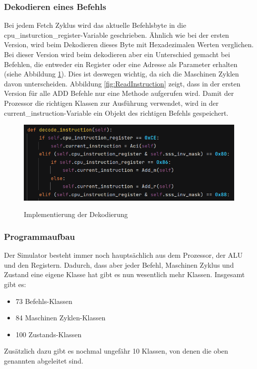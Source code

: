 \documentclass[12pt]{article}
\newcommand{\imgSpaceBefore}{\\[0.2cm]}
\begin{document}
\subsubsection{Dekodieren eines Befehls}
Bei jedem Fetch Zyklus wird das aktuelle Befehlsbyte in die cpu\_insturction\_register-Variable geschrieben. Ähnlich wie bei der ersten Version, wird beim Dekodieren dieses Byte mit Hexadezimalen Werten verglichen. Bei dieser Version wird beim dekodieren aber ein Unterschied gemacht bei Befehlen, die entweder ein Register oder eine Adresse als Parameter erhalten (siehe Abbildung \ref{fig:Decode_instr}). Dies ist deswegen wichtig, da sich die Maschinen Zyklen davon unterscheiden. Abbildung \ref{fig:ReadInstruction}  zeigt, dass in der ersten Version für alle ADD Befehle nur eine Methode aufgerufen wird. Damit der Prozessor die richtigen Klassen zur Ausführung verwendet, wird in der current\_instruction-Variable ein Objekt des richtigen Befehls gespeichert.
\imgSpaceBefore
\begin{figure}[H]
\caption{Implementierung der Dekodierung}
\centering
\includegraphics[width=15cm]{bilder/DecodeInstruction}
\label{fig:Decode_instr}
\end{figure}

\subsubsection{Programmaufbau}

Der Simulator besteht immer noch hauptsächlich aus dem Prozessor, der ALU und den Registern. Dadurch, dass aber jeder Befehl, Maschinen Zyklus und Zustand eine eigene Klasse  hat gibt es nun wesentlich mehr Klassen. Insgesamt gibt es:
\begin{itemize}
\item 73 Befehls-Klassen
\item 84 Maschinen Zyklen-Klassen
\item 100 Zustands-Klassen
\end{itemize}

\noindent
Zusätzlich dazu gibt es nochmal ungefähr 10 Klassen, von denen die oben genannten abgeleitet sind.
\end{document}
